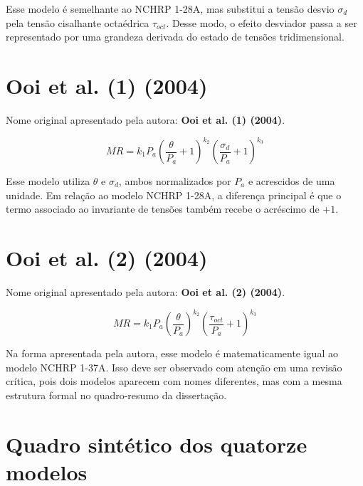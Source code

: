 \documentclass[12pt,a4paper]{article}
\begin{document}
Esse modelo é semelhante ao NCHRP 1-28A, mas substitui a tensão desvio $\sigma_d$ pela tensão cisalhante octaédrica $\tau_{oct}$. Desse modo, o efeito desviador passa a ser representado por uma grandeza derivada do estado de tensões tridimensional.

\section{Ooi et al. (1) (2004)}

Nome original apresentado pela autora: \textbf{Ooi et al. (1) (2004)}.

\begin{equation}
MR=k_1P_a
\left(\frac{\theta}{P_a}+1\right)^{k_2}
\left(\frac{\sigma_d}{P_a}+1\right)^{k_3}
\end{equation}

Esse modelo utiliza $\theta$ e $\sigma_d$, ambos normalizados por $P_a$ e acrescidos de uma unidade. Em relação ao modelo NCHRP 1-28A, a diferença principal é que o termo associado ao invariante de tensões também recebe o acréscimo de $+1$.

\section{Ooi et al. (2) (2004)}

Nome original apresentado pela autora: \textbf{Ooi et al. (2) (2004)}.

\begin{equation}
MR=k_1P_a
\left(\frac{\theta}{P_a}\right)^{k_2}
\left(\frac{\tau_{oct}}{P_a}+1\right)^{k_3}
\end{equation}

Na forma apresentada pela autora, esse modelo é matematicamente igual ao modelo NCHRP 1-37A. Isso deve ser observado com atenção em uma revisão crítica, pois dois modelos aparecem com nomes diferentes, mas com a mesma estrutura formal no quadro-resumo da dissertação.

\section*{Quadro sintético dos quatorze modelos}
\end{document}
